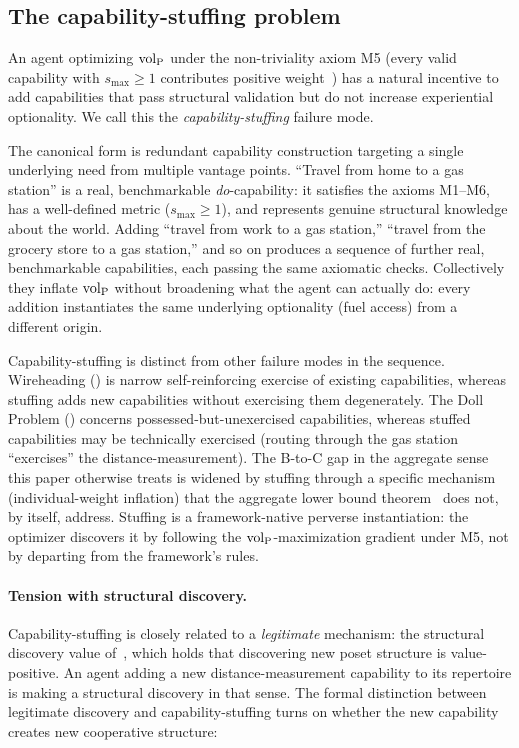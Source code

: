 \subsection{The capability-stuffing problem}
\label{sec:capability_stuffing}

An agent optimizing ${\operatorname{vol}_{\mathrm{P}}}$ under the non-triviality axiom M5
(every valid capability with $s_{\max} \geq 1$ contributes
positive weight~\citep[Proposition~1]{lasser2026poset}) has a
natural incentive to add capabilities that pass structural
validation but do not increase experiential optionality.  We call
this the \emph{capability-stuffing} failure mode.

The canonical form is redundant capability construction targeting
a single underlying need from multiple vantage points.  ``Travel
from home to a gas station'' is a real, benchmarkable
\emph{do}-capability: it satisfies the axioms M1--M6, has a
well-defined metric ($s_{\max} \geq 1$), and represents genuine
structural knowledge about the world.  Adding ``travel from work
to a gas station,'' ``travel from the grocery store to a gas
station,'' and so on produces a sequence of further real,
benchmarkable capabilities, each passing the same axiomatic
checks.  Collectively they inflate ${\operatorname{vol}_{\mathrm{P}}}$ without broadening
what the agent can actually do: every addition instantiates the
same underlying optionality (fuel access) from a different
origin.

Capability-stuffing is distinct from other failure modes in the
sequence.  Wireheading
(\citealp[Discussion]{lasser2026exo}) is narrow
self-reinforcing exercise of existing capabilities, whereas
stuffing adds new capabilities without exercising them
degenerately.  The Doll Problem
(\citealp[Section~7.1]{lasser2026gfm}) concerns
possessed-but-unexercised capabilities, whereas stuffed
capabilities may be technically exercised (routing through the
gas station ``exercises'' the distance-measurement).  The
B-to-C gap in the aggregate sense this paper otherwise treats
is widened by stuffing through a specific mechanism
(individual-weight inflation) that the aggregate lower
bound theorem~\citep[Revealed~Sacrifice]{lasser2026paper8a}
does not, by itself, address.  Stuffing is a framework-native
perverse instantiation: the optimizer discovers it by following
the ${\operatorname{vol}_{\mathrm{P}}}$-maximization gradient under M5, not by departing
from the framework's rules.

\paragraph{Tension with structural discovery.}
Capability-stuffing is closely related to a \emph{legitimate}
mechanism: the structural discovery value
of~\citep[Proposition~2]{lasser2026horizon}, which holds that
discovering new poset structure is value-positive.  An agent
adding a new distance-measurement capability to its repertoire is
making a structural discovery in that sense.  The formal
distinction between legitimate discovery and capability-stuffing
turns on whether the new capability creates new cooperative
structure:

